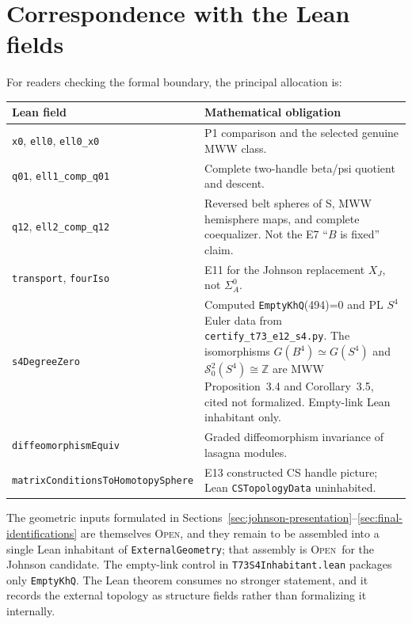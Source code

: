\documentclass[11pt]{amsart}
\theoremstyle{definition}
\theoremstyle{remark}
\newcommand{\Open}{\textnormal{\textsc{Open}}}
\begin{document}


\section{Correspondence with the Lean fields}\label{app:lean-fields}

For readers checking the formal boundary, the principal allocation is:
\begin{center}
\small
\begin{tabularx}{\textwidth}{@{}l X@{}}
\toprule
Lean field & Mathematical obligation \\
\midrule
\texttt{x0}, \texttt{ell0}, \texttt{ell0\_x0} & P1 comparison and the selected genuine MWW class. \\
\texttt{q01}, \texttt{ell1\_comp\_q01} & Complete two-handle beta/psi quotient and descent. \\
\texttt{q12}, \texttt{ell2\_comp\_q12} & Reversed belt spheres of S, MWW hemisphere maps, and complete coequalizer.  Not the E7 ``$B$ is fixed'' claim. \\
\texttt{transport}, \texttt{fourIso} & E11 for the Johnson replacement $X_J$, not $\Sigma_A^0$. \\
\texttt{s4DegreeZero} & Computed \texttt{EmptyKhQ}(494)=0 and PL $S^4$ Euler data from \texttt{certify\_t73\_e12\_s4.py}.  The isomorphisms $G(B^4)\simeq G(S^4)$ and $\mathcal S^2_0(S^4)\cong\mathbb Z$ are MWW Proposition~3.4 and Corollary~3.5, cited not formalized.  Empty-link Lean inhabitant only. \\
\texttt{diffeomorphismEquiv} & Graded diffeomorphism invariance of lasagna modules. \\
\texttt{matrixConditionsToHomotopySphere} & E13 constructed CS handle picture; Lean \texttt{CSTopologyData} uninhabited. \\
\bottomrule
\end{tabularx}
\end{center}

The geometric inputs formulated in Sections~\ref{sec:johnson-presentation}--\ref{sec:final-identifications}
are themselves \Open, and they remain to be assembled into a single Lean
inhabitant of \texttt{ExternalGeometry}; that assembly is \Open\ for the Johnson candidate.
The empty-link control in \texttt{T73S4Inhabitant.lean} packages only
\texttt{EmptyKhQ}.  The Lean theorem consumes no stronger statement, and it
records the external topology as structure fields rather than formalizing it
internally.



\end{document}

